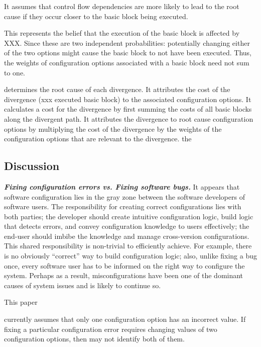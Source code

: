 It assumes that control flow dependencies are more likely
to lead to the root cause if they
occur closer to the basic block being executed.

This represents the belief that the execution of
the basic block is affected by XXX.
Since these are two independent probabilities:
potentially changing either of the two options
might cause the basic block to not have been executed.
Thus, the weights of configuration options associated
with a basic block need not sum to one.

\ourtool determines the root cause of each divergence.
It attributes the cost of the divergence (xxx executed
basic block) to the associated configuration options.
It calculates a cost for the divergence by first summing
the costs of all basic blocks along the divergent
path. It attributes the divergence
to root cause configuration options by multiplying
the cost of the divergence by the weights of the configuration
options that are relevant to the divergence.
the 



\subsection{Discussion}

\noindent \textbf{\textit{Fixing configuration errors vs. Fixing software bugs.}}
It appears that software configuration lies in the gray zone between
the software developers of software users.
The responsibility for creating correct configurations
lies with both parties; the developer should create
intuitive configuration logic, build logic that detects
errors, and convey configuration knowledge to users
effectively;  the end-user should imbibe the
knowledge and manage cross-version configurations.
This shared responsibility is non-trivial to efficiently
achieve. For example, there is no obviously ``correct'' way to
build configuration logic; also, unlike fixing a bug once,
every software user has to be informed on the right way to
configure the system. Perhaps as a result, misconfigurations
have been one of the dominant causes of system issues and
is likely to continue so.

This paper


\ourtool currently assumes that only one
configuration option has an incorrect value.
If fixing a particular configuration error
requires changing values of two configuration options,
then \ourtool may not identify both of them.


